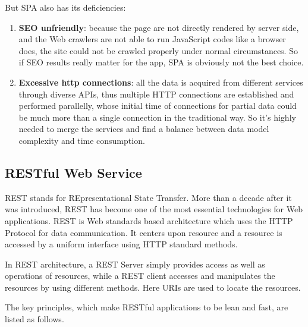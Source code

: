 But SPA also has its deficiencies:

\begin{enumerate}
\item
\textbf{\gls{SEO} unfriendly}: because the page are not directly rendered by server side, and the Web crawlers are not able to run JavaScript codes like a browser does, the site could not be crawled properly under normal circumstances. So if SEO results really matter for the app, SPA is obviously not the best choice.
\item
\textbf{Excessive http connections}: all the data is acquired from different services through diverse \gls{API}s, thus multiple HTTP connections are established and performed parallelly, whose initial time of connections for partial data could be much more than a single connection in the traditional way. So it's highly needed to merge the services and find a balance between data model complexity and time consumption.
\end{enumerate}


\subsection{RESTful Web Service} \label{sec:tech-rest}
REST stands for REpresentational State Transfer. More than a decade after it was introduced, REST has become one of the most essential technologies for Web applications\cite{richardson2008restful}. REST is Web standards based architecture which uses the HTTP Protocol for data communication. It  centers upon resource  and a resource is accessed by a uniform interface using HTTP standard methods.

In REST architecture, a REST Server simply provides access as well as operations of resources, while a  REST client accesses and manipulates the resources by using different methods. Here URIs are used to locate the resources.


The key principles, which make RESTful applications to be lean and fast, are listed as follows\cite{hamad2010performance}.

